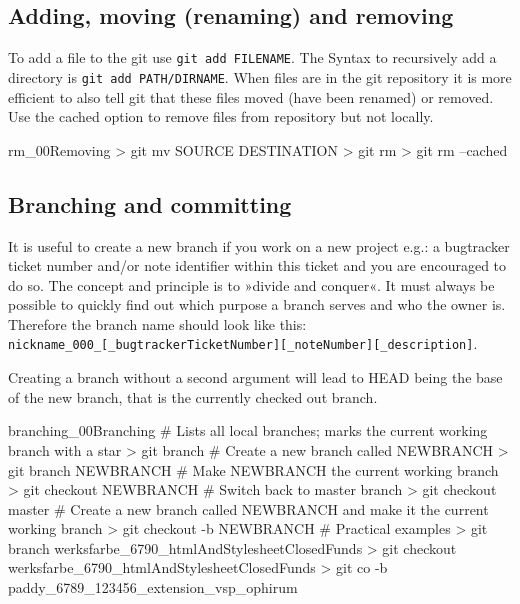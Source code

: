 \subsection{Adding, moving (renaming) and removing}
To add a file to the git use \texttt{git add FILENAME}. The Syntax to recursively add a directory is \texttt{git add PATH/DIRNAME}. When files are in the git repository it is more efficient to also tell git that these files moved (have been renamed) or removed. Use the cached option to remove files from repository but not locally.
\begin{codelisting}{rm_00}{Removing}
> git mv SOURCE DESTINATION
> git rm
> git rm --cached
\end{codelisting}
\subsection{Branching and committing}\label{sec:branching_and_comitting}
It is useful to create a new branch if you work on a new project e.g.: a bugtracker ticket number and/or note identifier within this ticket and you are encouraged to do so. The concept and principle is to »divide and conquer«. It must always be possible to quickly find out which purpose a branch serves and who the owner is. Therefore the branch name should look like this:\\ \texttt{nickname\_000\_{[\_bugtrackerTicketNumber]}{[\_noteNumber]}{[\_description]}}.

Creating a branch without a second argument will lead to HEAD being the base of the new branch, that is the currently checked out branch.
\begin{codelisting}{branching_00}{Branching}
# Lists all local branches; marks the current working branch with a star
> git branch
# Create a new branch called NEWBRANCH
> git branch NEWBRANCH
# Make NEWBRANCH the current working branch
> git checkout NEWBRANCH
# Switch back to master branch
> git checkout master
# Create a new branch called NEWBRANCH and make it the current working branch
> git checkout -b NEWBRANCH
# Practical examples
> git branch werksfarbe_6790_htmlAndStylesheetClosedFunds
> git checkout werksfarbe_6790_htmlAndStylesheetClosedFunds
> git co -b paddy_6789_123456_extension_vsp_ophirum
\end{codelisting}
